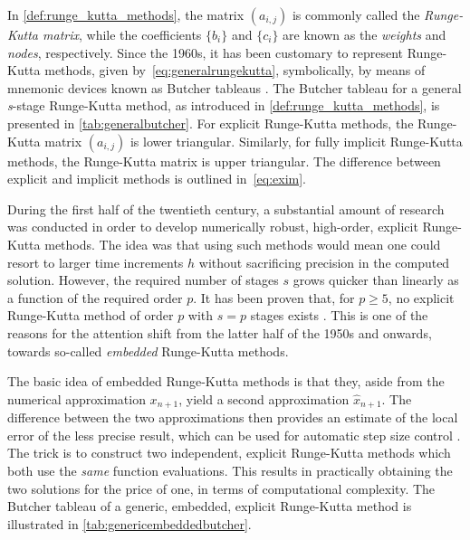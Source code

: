 In \cref{def:runge_kutta_methods}, the matrix $(a_{i,j})$ is commonly called
the \emph{Runge-Kutta matrix}, while the coefficients $\{b_{i}\}$ and
$\{c_{i}\}$ are known as the \emph{weights} and \emph{nodes}, respectively.
Since the 1960s, it has been customary to represent Runge-Kutta methods, given
by~\cref{eq:generalrungekutta}, symbolically, by means of mnemonic devices
known as Butcher tableaus \parencite[p.134]{hairer1993solving}. The Butcher
tableau for a general \emph{s}-stage Runge-Kutta method, as introduced in
\cref{def:runge_kutta_methods}, is presented in \cref{tab:generalbutcher}.
For explicit Runge-Kutta methods, the Runge-Kutta matrix $(a_{i,j})$ is lower
triangular. Similarly, for fully implicit Runge-Kutta methods, the Runge-Kutta
matrix is upper triangular. The difference between explicit and implicit
methods is outlined in~\cref{eq:exim}.



During the first half of the twentieth century, a substantial amount of
research was conducted in order to develop numerically robust, high-order,
explicit Runge-Kutta methods. The idea was that using such methods would mean
one could resort to larger time increments $h$ without sacrificing precision in
the computed solution. However, the required number of stages $s$ grows quicker
than linearly as a function of the required order $p$. It has been proven that,
for $p\geq5$, no explicit Runge-Kutta method of order $p$ with $s=p$ stages
exists \parencite[p.173]{hairer1993solving}. This is one of the reasons for the
attention shift from the latter half of the 1950s and onwards, towards
so-called \emph{embedded} Runge-Kutta methods.

The basic idea of embedded Runge-Kutta methods is that they, aside from the
numerical approximation $x_{n+1}$, yield a second approximation
$\widehat{x}_{n+1}$. The difference between the two approximations then
provides an estimate of the local error of the less precise result, which can
be used for automatic step size control
\parencite[pp.167--168]{hairer1993solving}. The trick is to construct two
independent, explicit Runge-Kutta methods which both use the \emph{same}
function evaluations. This results in practically obtaining the two solutions
for the price of one, in terms of computational complexity. The Butcher tableau
of a generic, embedded, explicit Runge-Kutta method is illustrated in
\cref{tab:genericembeddedbutcher}.

